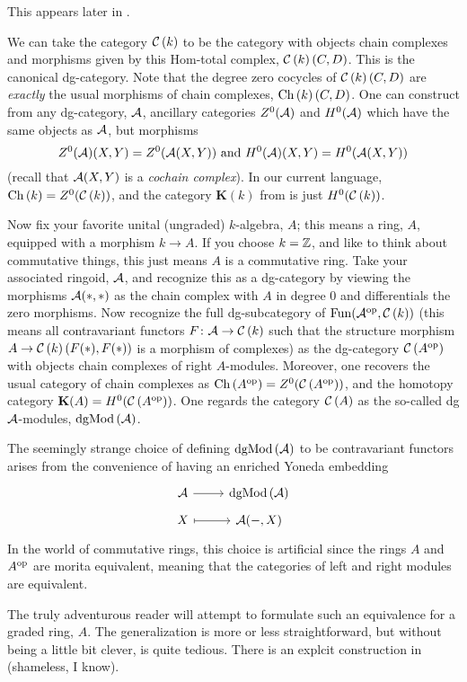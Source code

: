 \documentclass[reqno, 12pt]{amsart}
\begin{document}
\begin{exercise}
\begin{remark}
\begin{enumerate}
      This appears later in \cite{Weibel95}.
    \end{enumerate}
  \end{remark}
  We can take the category $\mathcal{C}\left(k\right)$ to be the category with objects chain complexes and morphisms given by this Hom-total complex, $\mathcal{C}\left(k\right)(C,D)$.
  This is the canonical dg-category.
  Note that the degree zero cocycles of $\mathcal{C}\left(k\right)(C,D)$ are \emph{exactly} the usual morphisms of chain complexes, $\operatorname{Ch}\left(k\right)(C,D)$.
  One can construct from any dg-category, $\mathcal{A}$, ancillary categories $Z^0(\mathcal{A})$ and $H^0(\mathcal{A})$ which have the same objects as $\mathcal{A}$, but morphisms
  $$Z^0(\A)(X,Y) = Z^0(\A(X,Y))\ \text{and}\ H^0(\A)(X,Y) = H^0(\A(X,Y))$$
  (recall that $\mathcal{A}(X,Y)$ is a \emph{cochain complex}).
  In our current language, $\operatorname{Ch}\left(k\right) = Z^0(\mathcal{C}\left(k\right))$, and the category $\mathbf{K}(k)$ from \cite[Exercise 1.4.5]{Weibel95} is just $H^0(\mathcal{C}\left(k\right))$.
  

  Now fix your favorite unital (ungraded) $k$-algebra, $A$; this means a ring, $A$, equipped with a morphism $k \to A$.
  If you choose $k = \mathbb{Z}$, and like to think about commutative things, this just means $A$ is a commutative ring.
  Take your associated ringoid, $\mathcal{A}$, and recognize this as a dg-category by viewing the morphisms $\mathcal{A}(\ast,\ast)$ as the chain complex with $A$ in degree 0 and differentials the zero morphisms.
  Now recognize the full dg-subcategory of $\operatorname{Fun}(\mathcal{A}^{\operatorname{op}},\mathcal{C}\left(k\right))$ (this means all contravariant functors $F \colon \mathcal{A} \to \mathcal{C}\left(k\right)$ such that the structure morphism $A \to \mathcal{C}\left(k\right)(F(\ast), F(\ast))$ is a morphism of complexes) as the dg-category $\mathcal{C}\left(A^{\operatorname{op}}\right)$ with objects chain complexes of right $A$-modules.
  Moreover, one recovers the usual category of chain complexes as $\operatorname{Ch}\left(A^{\operatorname{op}}\right) = Z^0(\mathcal{C}\left(A^{\operatorname{op}}\right))$, and the homotopy category $\mathbf{K}(A) = H^0(\mathcal{C}\left(A^{\operatorname{op}}\right))$.
  One regards the category $\mathcal{C}\left(A\right)$ as the so-called dg $\mathcal{A}$-modules, $\operatorname{dgMod}\left(\mathcal{A}\right)$.

  The seemingly strange choice of defining $\operatorname{dgMod}\left(\mathcal{A}\right)$ to be contravariant functors arises from the convenience of having an enriched Yoneda embedding
  $$\begin{tikzcd}[row sep=tiny]
    \A \arrow{r}& \dgMod{\A}\\
    X \arrow[mapsto]{r} & \A(-, X)
  \end{tikzcd}$$
  In the world of commutative rings, this choice is artificial since the rings $A$ and $A^{\operatorname{op}}$ are morita equivalent, meaning that the categories of left and right modules are equivalent.

  The truly adventurous reader will attempt to formulate such an equivalence for a graded ring, $A$.
  The generalization is more or less straightforward, but without being a little bit clever, is quite tedious.
  There is an explcit construction in \cite{KNCP} (shameless, I know).
\end{exercise}
\end{document}
